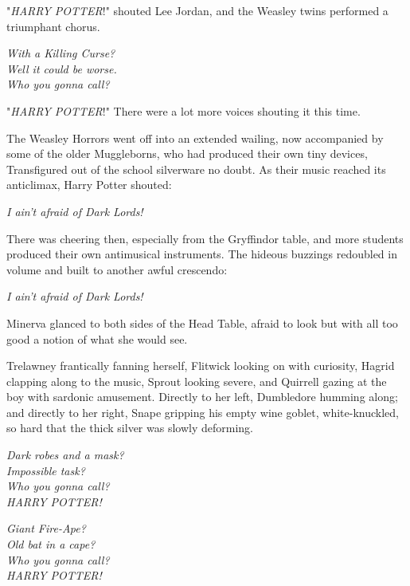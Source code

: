 "\emph{HARRY POTTER}!" shouted Lee Jordan, and the Weasley twins performed a
triumphant chorus.

\begin{center}
\emph{With a Killing Curse?\\
Well it could be worse.\\
Who you gonna call?}
\end{center}

"\emph{HARRY POTTER}!" There were a lot more voices shouting it this time.

The Weasley Horrors went off into an extended wailing, now accompanied by some
of the older Muggleborns, who had produced their own tiny devices, Transfigured
out of the school silverware no doubt. As their music reached its anticlimax,
Harry Potter shouted:

\begin{center}
\emph{I ain't afraid of Dark Lords!}
\end{center}

There was cheering then, especially from the Gryffindor table, and more
students produced their own antimusical instruments. The hideous buzzings
redoubled in volume and built to another awful crescendo:

\begin{center}
\emph{I ain't afraid of Dark Lords!}
\end{center}

Minerva glanced to both sides of the Head Table, afraid to look but with all
too good a notion of what she would see.

Trelawney frantically fanning herself, Flitwick looking on with curiosity,
Hagrid clapping along to the music, Sprout looking severe, and Quirrell gazing
at the boy with sardonic amusement. Directly to her left, Dumbledore humming
along; and directly to her right, Snape gripping his empty wine goblet,
white-knuckled, so hard that the thick silver was slowly deforming.

\begin{center}
\emph{Dark robes and a mask?\\
Impossible task?\\
Who you gonna call?\\
HARRY POTTER!}

\emph{Giant Fire-Ape?\\
Old bat in a cape?\\
Who you gonna call?\\
HARRY POTTER!}
\end{center}

